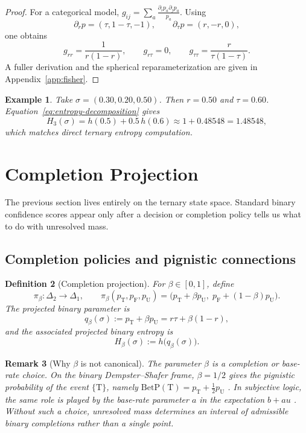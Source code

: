 \documentclass[11pt]{article}
\newtheorem{definition}{Definition}[section]
\newtheorem{remark}[definition]{Remark}
\newtheorem{example}[definition]{Example}
\newcommand{\T}{\mathrm{T}}
\newcommand{\F}{\mathrm{F}}
\newcommand{\U}{\mathrm{U}}
\newcommand{\BetP}{\mathrm{BetP}}
\newcommand{\1}{\mathbf{1}}
\newcommand{\hbin}{h}
\begin{document}
\begin{proof}
For a categorical model, $g_{ij}=\sum_a \frac{\partial_i p_a\partial_j p_a}{p_a}$. Using
\[
\partial_r p=(\tau,1-\tau,-1),
\qquad
\partial_\tau p=(r,-r,0),
\]
one obtains
\[
g_{rr}=\frac{1}{r(1-r)},
\qquad
g_{r\tau}=0,
\qquad
g_{\tau\tau}=\frac{r}{\tau(1-\tau)}.
\]
A fuller derivation and the spherical reparameterization are given in Appendix~\ref{app:fisher}.
\end{proof}

\begin{example}
Take $\sigma=(0.30,0.20,0.50)$. Then $r=0.50$ and $\tau=0.60$. Equation~\eqref{eq:entropy-decomposition} gives
\[
H_3(\sigma)=\hbin(0.5)+0.5\,\hbin(0.6)\approx 1+0.48548=1.48548,
\]
which matches direct ternary entropy computation.
\end{example}

\section{Completion Projection}

The previous section lives entirely on the ternary state space. Standard binary confidence scores appear only after a decision or completion policy tells us what to do with unresolved mass.

\subsection{Completion policies and pignistic connections}

\begin{definition}[Completion projection]
For $\beta\in[0,1]$, define
\begin{equation}
\pi_\beta:\Delta_2\to\Delta_1,
\qquad
\pi_\beta(p_\T,p_\F,p_\U)
=
\bigl(p_\T+\beta p_\U,\; p_\F+(1-\beta)p_\U\bigr).
\label{eq:completion-projection}
\end{equation}
The projected binary parameter is
\begin{equation}
q_\beta(\sigma):=p_\T+\beta p_\U=r\tau+\beta(1-r),
\label{eq:qbeta}
\end{equation}
and the associated projected binary entropy is
\begin{equation}
H_\beta(\sigma):=\hbin\bigl(q_\beta(\sigma)\bigr).
\label{eq:Hbeta}
\end{equation}
\end{definition}

\begin{remark}[Why $\beta$ is not canonical]
The parameter $\beta$ is a completion or base-rate choice. On the binary Dempster--Shafer frame, $\beta=1/2$ gives the pignistic probability of the event $\{\T\}$, namely $\BetP(\T)=p_\T+\tfrac12 p_\U$ \citep{Smets90,SmetsKennes94}. In subjective logic, the same role is played by the base-rate parameter $a$ in the expectation $b+a u$ \citep{Josang16}. Without such a choice, unresolved mass determines an interval of admissible binary completions rather than a single point.
\end{remark}
\end{document}
